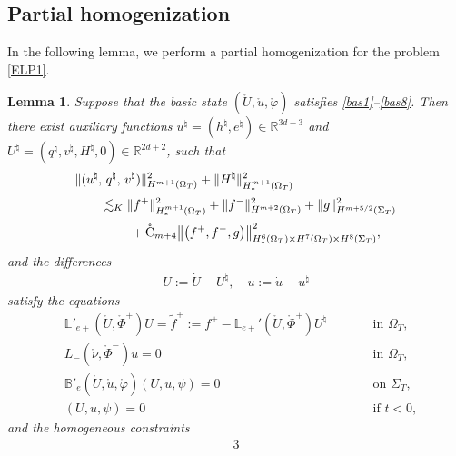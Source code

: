 \documentclass[twoside,11pt]{article}
\numberwithin{equation}{section}
\newtheorem{lemma}{Lemma}[section]
\begin{document}
	\subsection{Partial homogenization}
In the following lemma, we perform a partial homogenization for the problem \eqref{ELP1}.
	
	\begin{lemma}
	\label{lem:homo}		
		Suppose that the basic state $(\mathring{U},\mathring{u},\mathring{\varphi}) $ satisfies \eqref{bas1}--\eqref{bas8}.
		Then there exist auxiliary functions  $u^{\natural}=(h^{\natural}, e^{\natural}) \in\mathbb{R}^{3d-3}$
		and $U^{\natural}=(q^{\natural}, v^{\natural}, H^{\natural},0)\in\mathbb{R}^{2d+2}$, such that
		\begin{align} \nonumber
			&	 \|(u^{\natural},\, q^{\natural},\, v^{\natural})\|_{H^{m+1}(\Omega_{T})}^2
			+\|H^{\natural}\|_{H_*^{m+1}(\Omega_{T})}^2\\[0.5mm]
			&\qquad \lesssim_{K}
			\|f^+  \|_{H_*^{m+1}(\Omega_{T}) }^2+\|f^-  \|_{H^{m+2}(\Omega_{T}) }^2
			+\|g\|_{H^{m+{5/2}}(\Sigma_T)}^2
			\nonumber\\[0.5mm]
			& \qquad \qquad\
			+\mathring{\rm C}_{m+4}
			\big\|\big(f^+,f^-, g \big) \big\|_{H_*^{6}(\Omega_{T}) \times H^{7}(\Omega_{T}) \times H^{8}(\Sigma_{T})  }^2,
			\label{Unatural:es}
		\end{align}
		and the {differences}
		\begin{align} \label{Uu:def}
			U:=\dot{U}-U^{\natural},\quad {u}:=\dot{u}-u^{\natural}
		\end{align}	
		satisfy the equations
		\begin{subequations} \label{ELP2}
			\begin{alignat}{3}
				\label{ELP2a}
				&\mathbb{L}'_{e+}(\mathring{U}, \mathring{\Phi}^+) {U}=\tilde{f}^+
				:= f^+-\mathbb{L}_{e+}'(\mathring{U},\mathring{\Phi}^+)U^{\natural}
				&\qquad &  \textrm{in } \Omega_T,\\[0.5mm]
				\label{ELP2b}
				& L_-(\mathring{\nu},\mathring{\Phi}^-) {u}=0
				&& \textrm{in }\Omega_T,\\[0.5mm]
				\label{ELP2c}
				&  \mathbb{B}'_{e}(\mathring{U}, \mathring{u}, \mathring{\varphi}) (U,{u},\psi)=0
				&& \textrm{on } \Sigma_T,\\[0.8mm]
				\label{ELP2d}
				&
				({U},u,\psi) =0   &&\textrm{if } t<0,
			\end{alignat}
		\end{subequations}
		and the homogeneous constraints
		\begin{alignat}{3}

\end{alignat}
\end{lemma}
\end{document}
